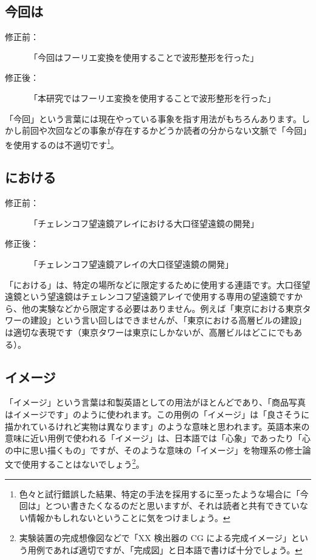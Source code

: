 \subsection{今回は}

\begin{description}
\item[修正前：]「今回はフーリエ変換を使用することで波形整形を行った」
\item[修正後：]「本研究ではフーリエ変換を使用することで波形整形を行った」
\end{description}

「今回」という言葉には現在やっている事象を指す用法がもちろんあります。しかし前回や次回などの事象が存在するかどうか読者の分からない文脈で「今回」を使用するのは不適切です\footnote{色々と試行錯誤した結果、特定の手法を採用するに至ったような場合に「今回は」とつい書きたくなるのだと思いますが、それは読者と共有できていない情報かもしれないということに気をつけましょう。}。

\subsection{における}

\begin{description}
\item[修正前：]「チェレンコフ望遠鏡アレイにおける大口径望遠鏡の開発」
\item[修正後：]「チェレンコフ望遠鏡アレイの大口径望遠鏡の開発」
\end{description}

「における」は、特定の場所などに限定するために使用する連語です。大口径望遠鏡という望遠鏡はチェレンコフ望遠鏡アレイで使用する専用の望遠鏡ですから、他の実験などから限定する必要はありません。例えば「東京における東京タワーの建設」という言い回しはできませんが、「東京における高層ビルの建設」は適切な表現です（東京タワーは東京にしかないが、高層ビルはどこにでもある）。

\subsection{イメージ}

「イメージ」という言葉は和製英語としての用法がほとんどであり、「商品写真はイメージです」のように使われます。この用例の「イメージ」は「良さそうに描かれているけれど実物は異なります」のような意味と思われます。英語本来の意味に近い用例で使われる「イメージ」は、日本語では「心象」であったり「心の中に思い描くもの」ですが、そのような意味の「イメージ」を物理系の修士論文で使用することはないでしょう\footnote{実験装置の完成想像図などで「XX 検出器の CG による完成イメージ」という用例であれば適切ですが、「完成図」と日本語で書けば十分でしょう。}。

